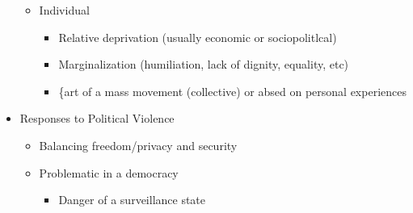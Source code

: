 \documentclass[11pt]{article}
\begin{document}
\begin{itemize}
\begin{itemize}
\begin{itemize}
\end{itemize}
\item Individual
\begin{itemize}
\item Relative deprivation (usually economic or sociopolitlcal)
\item Marginalization (humiliation, lack of dignity, equality, etc)
\item \{art of a mass movement (collective) or absed on personal experiences
\end{itemize}
\end{itemize}
\item Responses to Political Violence
\begin{itemize}
\item Balancing freedom/privacy and security
\item Problematic in a democracy
\begin{itemize}
\item Danger of a surveillance state
\end{itemize}
\end{itemize}
\end{itemize}
\end{document}

